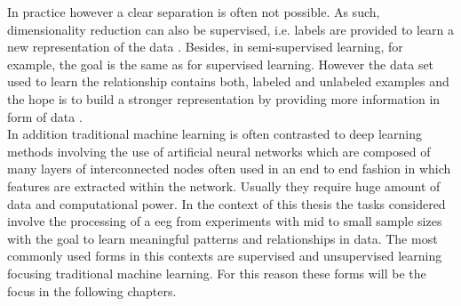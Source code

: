 In practice however a clear separation is often not possible. As such, dimensionality reduction can also be supervised, i.e. labels are provided to learn a new representation of the data \cite{mcinnes2018umap}. Besides, in semi-supervised learning, for example, the goal is the same as for supervised learning. However the data set used to learn the relationship contains both, labeled and unlabeled examples and the hope is to build a stronger representation by providing more information in form of data \cite{Burkov2019}. \\
In addition traditional machine learning is often contrasted to deep learning methods involving the use of artificial neural networks which are composed of many layers of interconnected nodes often used in an end to end fashion in which features are extracted within the network. Usually they require huge amount of data and computational power. In the context of this thesis the tasks considered involve the processing of a \gls{eeg} from experiments with mid to small sample sizes with the goal to learn meaningful patterns and relationships in data. The most commonly used forms in this contexts are supervised and unsupervised learning focusing traditional machine learning. For this reason these forms will be the focus in the following chapters.

